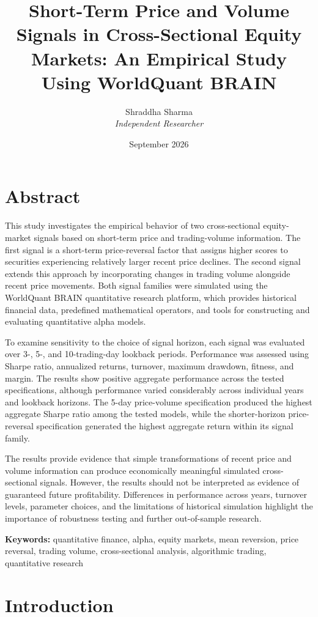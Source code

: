 \documentclass{article}
\title{Short-Term Price and Volume Signals in Cross-Sectional Equity Markets: An Empirical Study Using WorldQuant BRAIN}
\author{
    Shraddha Sharma\\
    \textit{Independent Researcher}
}
\date{September 2026}
\begin{document}
\maketitle




\section{Abstract}

This study investigates the empirical behavior of two cross-sectional equity-market signals based on short-term price and trading-volume information. The first signal is a short-term price-reversal factor that assigns higher scores to securities experiencing relatively larger recent price declines. The second signal extends this approach by incorporating changes in trading volume alongside recent price movements. Both signal families were simulated using the WorldQuant BRAIN quantitative research platform, which provides historical financial data, predefined mathematical operators, and tools for constructing and evaluating quantitative alpha models. 

To examine sensitivity to the choice of signal horizon, each signal was evaluated over 3-, 5-, and 10-trading-day lookback periods. Performance was assessed using Sharpe ratio, annualized returns, turnover, maximum drawdown, fitness, and margin. The results show positive aggregate performance across the tested specifications, although performance varied considerably across individual years and lookback horizons. The 5-day price-volume specification produced the highest aggregate Sharpe ratio among the tested models, while the shorter-horizon price-reversal specification generated the highest aggregate return within its signal family.

The results provide evidence that simple transformations of recent price and volume information can produce economically meaningful simulated cross-sectional signals. However, the results should not be interpreted as evidence of guaranteed future profitability. Differences in performance across years, turnover levels, parameter choices, and the limitations of historical simulation highlight the importance of robustness testing and further out-of-sample research.

\textbf{Keywords:} quantitative finance, alpha, equity markets, mean reversion, price reversal, trading volume, cross-sectional analysis, algorithmic trading, quantitative research

 \section{Introduction}
\end{document}
